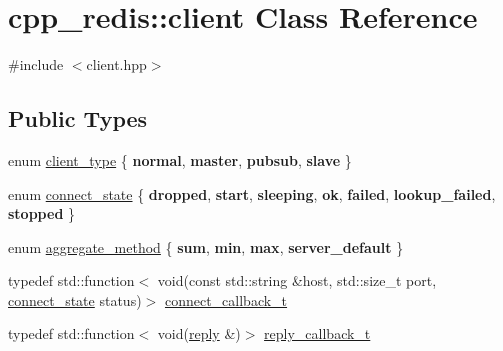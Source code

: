 \hypertarget{classcpp__redis_1_1client}{}\section{cpp\+\_\+redis\+:\+:client Class Reference}
\label{classcpp__redis_1_1client}


{\ttfamily \#include $<$client.\+hpp$>$}

\subsection*{Public Types}
\begin{DoxyCompactItemize}
\item 
enum \hyperlink{classcpp__redis_1_1client_a388877b01b4e045cddb138e70a68e000}{client\+\_\+type} \{ {\bfseries normal}, 
{\bfseries master}, 
{\bfseries pubsub}, 
{\bfseries slave}
 \}
\item 
enum \hyperlink{classcpp__redis_1_1client_a2512bd48dd45391249a69bd720c1e4da}{connect\+\_\+state} \{ \newline
{\bfseries dropped}, 
{\bfseries start}, 
{\bfseries sleeping}, 
{\bfseries ok}, 
\newline
{\bfseries failed}, 
{\bfseries lookup\+\_\+failed}, 
{\bfseries stopped}
 \}
\item 
enum \hyperlink{classcpp__redis_1_1client_aa197ca5b36da793c701d3ba388ec4946}{aggregate\+\_\+method} \{ {\bfseries sum}, 
{\bfseries min}, 
{\bfseries max}, 
{\bfseries server\+\_\+default}
 \}
\item 
typedef std\+::function$<$ void(const std\+::string \&host, std\+::size\+\_\+t port, \hyperlink{classcpp__redis_1_1client_a2512bd48dd45391249a69bd720c1e4da}{connect\+\_\+state} status)$>$ \hyperlink{classcpp__redis_1_1client_a4bb592b64ededde5a6fcf8111ca2548f}{connect\+\_\+callback\+\_\+t}
\item 
typedef std\+::function$<$ void(\hyperlink{classcpp__redis_1_1reply}{reply} \&)$>$ \hyperlink{classcpp__redis_1_1client_a061a1140d36d2eaeda82b09a0bb3f9f2}{reply\+\_\+callback\+\_\+t}
\end{DoxyCompactItemize}
